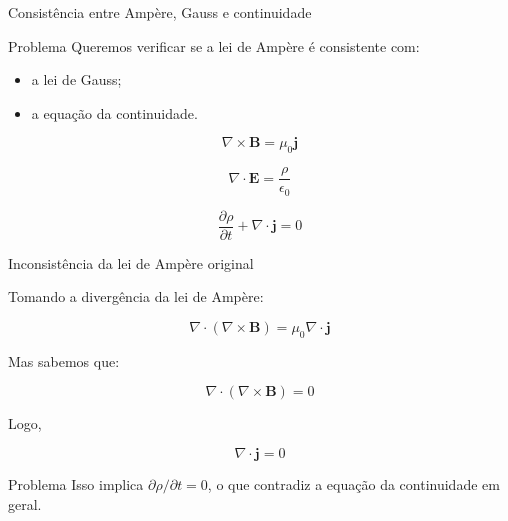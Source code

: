 \documentclass[aspectratio=169]{beamer}
\begin{document}

\begin{frame}{Consistência entre Ampère, Gauss e continuidade}
\small

\begin{block}{Problema}
Queremos verificar se a lei de Ampère é consistente com:
\begin{itemize}\setlength{\itemsep}{2pt}
\item a lei de Gauss;
\item a equação da continuidade.
\end{itemize}
\end{block}

\vspace{0.1cm}

\begin{equation}
\nabla\times \mathbf{B}=\mu_0 \mathbf{j}
\tag{2.30}
\label{eq:ampere_old}
\end{equation}

\begin{equation}
\nabla\cdot \mathbf{E}=\frac{\rho}{\epsilon_0}
\tag{2.31}
\label{eq:gauss}
\end{equation}

\begin{equation}
\frac{\partial \rho}{\partial t}+\nabla\cdot \mathbf{j}=0
\tag{2.13}
\label{eq:continuity}
\end{equation}

\end{frame}


\begin{frame}{Inconsistência da lei de Ampère original}
\small

Tomando a divergência da lei de Ampère:

\begin{equation}
\nabla\cdot(\nabla\times \mathbf{B})
=
\mu_0 \nabla\cdot \mathbf{j}
\label{eq:div_ampere_old}
\end{equation}

Mas sabemos que:

\begin{equation}
\nabla\cdot(\nabla\times \mathbf{B})=0
\label{eq:div_curl}
\end{equation}

Logo,

\begin{equation}
\nabla\cdot \mathbf{j}=0
\label{eq:wrong_result}
\end{equation}

\vspace{0.1cm}

\begin{alertblock}{Problema}
Isso implica \(\partial \rho/\partial t = 0\), o que contradiz a equação da continuidade em geral.
\end{alertblock}

\end{frame}
\end{document}
